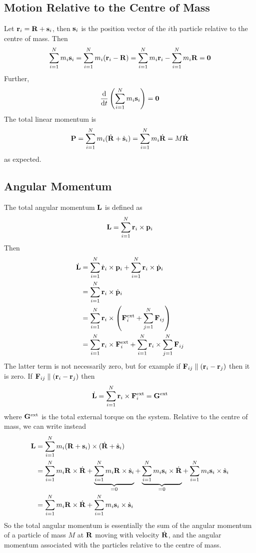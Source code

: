 \subsection{Motion Relative to the Centre of Mass}
Let \(\vb r_i = \vb R + \vb s_i\), then \(\vb s_i\) is the position vector of the \(i\)th particle relative to the centre of mass.
Then
\[
	\sum_{i=1}^N m_i \vb s_i = \sum_{i=1}^N m_i (\vb r_i - \vb R) = \sum_{i=1}^N m_i \vb r_i - \sum_{i=1}^N m_i \vb R = \vb 0
\]
Further,
\[
	\dv{t} \left( \sum_{i=1}^N m_i \vb s_i \right) = \vb 0
\]
The total linear momentum is
\[
	\vb P = \sum_{i=1}^N m_i (\dot{\vb R} + \dot{\vb s}_i) = \sum_{i=1}^N m_i \dot{\vb R} = M\dot{\vb R}
\]
as expected.

\subsection{Angular Momentum}
The total angular momentum \(\vb L\) is defined as
\[
	\vb L = \sum_{i=1}^N \vb r_i \times \vb p_i
\]
Then
\begin{align*}
	\dot{\vb L} & = \sum_{i=1}^N \dot{\vb r}_i \times \vb p_i + \sum_{i=1}^N \vb r_i \times \dot{\vb p}_i                \\
	            & = \sum_{i=1}^N \vb r_i \times \dot{\vb p}_i                                                            \\
	            & = \sum_{i=1}^N \vb r_i \times \left( \vb F_i^\text{ext} + \sum_{j=1}^N \vb F_{ij} \right)              \\
	            & = \sum_{i=1}^N \vb r_i \times \vb F_i^\text{ext} + \sum_{i=1}^N \vb r_i \times \sum_{j=1}^N \vb F_{ij} \\
\end{align*}
The latter term is not necessarily zero, but for example if \(\vb F_{ij} \parallel (\vb r_i - \vb r_j)\) then it is zero.
If \(\vb F_{ij} \parallel (\vb r_i - \vb r_j)\) then
\[
	\dot{\vb L} = \sum_{i=1}^N \vb r_i \times \vb F_i^\text{ext} = \vb G^\text{ext}
\]
where \(\vb G^\text{ext}\) is the total external torque on the system.
Relative to the centre of mass, we can write instead
\begin{align*}
	\vb L & = \sum_{i=1}^N m_i (\vb R + \vb s_i) \times (\dot{\vb R} + \dot{\vb s}_i)                                                                                                                                                   \\
	      & = \sum_{i=1}^N m_i \vb R \times \dot{\vb R} + \underbrace{\sum_{i=1}^N m_i \vb R \times \dot{\vb s}_i}_{=0} + \underbrace{\sum_{i=1}^N m_i \vb s_i \times \dot{\vb R}}_{=0} + \sum_{i=1}^N m_i \vb s_i \times \dot{\vb s}_i \\
	      & = \sum_{i=1}^N m_i \vb R \times \dot{\vb R} + \sum_{i=1}^N m_i \vb s_i \times \dot{\vb s}_i
\end{align*}
So the total angular momentum is essentially the sum of the angular momentum of a particle of mass \(M\) at \(\vb R\) moving with velocity \(\dot{\vb R}\), and the angular momentum associated with the particles relative to the centre of mass.

